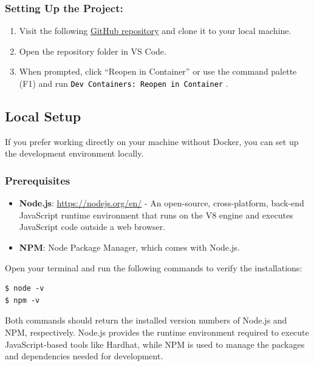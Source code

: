 \documentclass[12pt]{article}
\newcommand{\codegrey}[1]{%
  \texttt{\colorbox{black!4}{\textcolor{black}{#1}}}%
}
\begin{document}
\subsubsection*{Setting Up the Project:}

\begin{enumerate}
    \item Visit the following
          \href{https://github.com/radovluk/Smart-Contract-Exercise/tree/main/05-Re-Entrancy/task/task-code}{GitHub
              repository} and clone it to your local machine.
    \item Open the repository folder in VS Code.
    \item When prompted, click ``Reopen in Container'' or use the command palette (F1)
          and run \codegrey{Dev Containers: Reopen in Container}.
\end{enumerate}

\subsection{Local Setup}

If you prefer working directly on your machine without Docker, you can set up
the development environment locally.

\subsubsection*{Prerequisites}
\begin{itemize}
    \item \textbf{Node.js}: \url{https://nodejs.org/en/} - An open-source, cross-platform, back-end JavaScript runtime environment that runs on the V8 engine and executes JavaScript code outside a web browser.
    \item \textbf{NPM}: Node Package Manager, which comes with Node.js.
\end{itemize}

\noindent
Open your terminal and run the following commands to verify the installations:

\begin{verbatim}
$ node -v
$ npm -v
\end{verbatim}

Both commands should return the installed version numbers of Node.js and NPM,
respectively. Node.js provides the runtime environment required to execute
JavaScript-based tools like Hardhat, while NPM is used to manage the packages
and dependencies needed for development.
\end{document}
